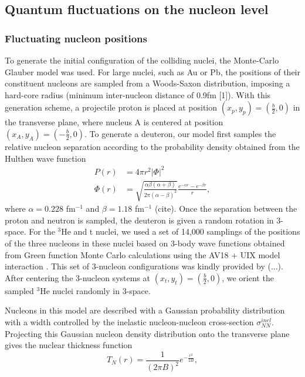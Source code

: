 \documentclass[twocolumn,showpacs,amsfonts,aps,prc,nofootinbib,floatfix]{revtex4}
\begin{document}
\subsection{Quantum fluctuations on the nucleon level}
\label{sec2a}
\subsubsection{Fluctuating nucleon positions}
\label{sec2a1}
To generate the initial configuration of the colliding nuclei, the Monte-Carlo Glauber model was used. For large nuclei, such as Au or Pb, the positions of their constituent nucleons are sampled from a Woods-Saxon distribution, imposing a hard-core radius (minimum inter-nucleon distance of 0.9fm [1]). With this generation scheme, a projectile proton is placed at position $(x_p,y_p)=(\frac{b}{2},0)$ in the transverse plane, where nucleus A is centered at position $(x_A,y_A)=(-\frac{b}{2},0)$. 
To generate a deuteron, our model first samples the relative nucleon separation according to the probability density obtained from the Hulthen wave function
\begin{align} 
\label{eq:HulthenPDF}
	P(r)&=4\pi r^2 |\Phi|^2\\
	\Phi(r)&=\sqrt{\frac{\alpha \beta(\alpha+\beta)}{2\pi(\alpha-\beta)^2}}\frac{e^{-\alpha r}-e^{-\beta r}}{r},
\end{align}
where $\alpha = 0.228$ fm$^{-1}$ and $\beta = 1.18$ fm$^{-1}$ (cite). Once the separation between the proton and neutron is sampled, the deuteron is given a random rotation in 3-space.
For the $^3$He and t nuclei, we used a set of 14,000 samplings of the positions of the three nucleons in these nuclei based on 3-body wave functions obtained from Green function Monte Carlo calculations using the AV18 + UIX model interaction \cite{Carlson:1997qn}. This set of 3-nucleon configurations was kindly provided by (...). After centering the 3-nucleon systems at $(x_t,y_t) = (\frac{b}{2},0)$, we orient the sampled $^3$He nuclei randomly in 3-space.

Nucleons in this model are described with a Gaussian probability distribution with a width controlled by the inelastic nucleon-nucleon cross-section $\sigma_{NN}^{inel}$. Projecting this Gaussian nucleon density distribution onto the transverse plane gives the nuclear thickness function \cite{Shen:2014vra}
\begin{equation} 
	T_{N}(r) = \frac{1}{(2\pi B)^2}e^{-\frac{r^2}{2B}},
\end{equation}
\end{document}
